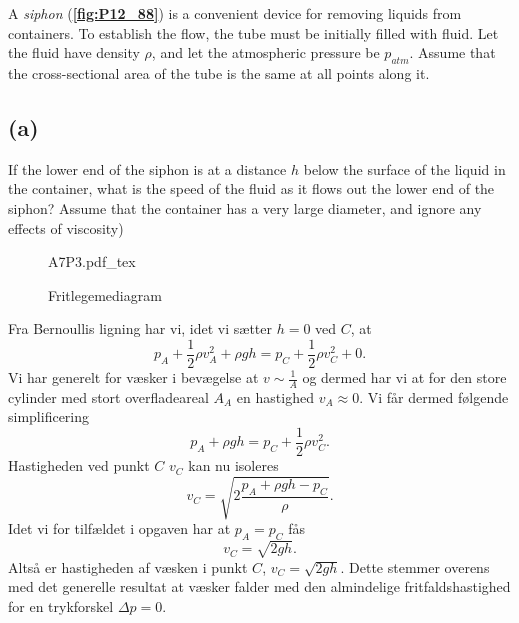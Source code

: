 \documentclass[12pt]{article}
\newcommand{\incfig}[2][1]{%
  \def\svgwidth{#1\columnwidth}
  {#2.pdf_tex}
}
\theoremstyle{definition}
\begin{document}
A \textit{siphon} (\textbf{\autoref{fig:P12_88}}) is a convenient device for removing liquids from containers. To establish the flow, the tube must be initially filled with fluid. Let the fluid have density $\rho$, and let the atmospheric pressure be $p_{atm}$. Assume that the cross-sectional area of the tube is the same at all points along it.

\subsection*{(a)}
If the lower end of the siphon is at a distance $h$ below the surface of the liquid in the container, what is the speed of the fluid as it flows out the lower end of the siphon? Assume that the container has a very large diameter, and ignore any effects of viscosity)
\bigbreak
\begin{figure}[ht]
  \centering
  \incfig[0.6]{A7P3}
  \caption{Fritlegemediagram}
  \label{fig:A7P3}
\end{figure}
\bigbreak
Fra Bernoullis ligning har vi, idet vi sætter $h = 0$ ved $C$, at
\[ 
p_A + \frac{1}{2}\rho v_A^2 + \rho gh = p_C + \frac{1}{2}\rho v_C^2 + 0
.\]
Vi har generelt for væsker i bevægelse at $v \sim \frac{1}{A}$ og dermed har vi at for den store cylinder med stort overfladeareal $A_A$ en hastighed $v_A \approx 0$. Vi får dermed følgende simplificering
\[ 
p_A + \rho gh = p_C + \frac{1}{2}\rho v_C^2
.\]
Hastigheden ved punkt $C$ $v_C$ kan nu isoleres
\[ 
  v_C = \sqrt{2\frac{p_A + \rho gh - p_C}{\rho}}
.\]
Idet vi for tilfældet i opgaven har at $p_A = p_C$ fås
\[ 
v_C = \sqrt{2gh}
.\]
Altså er hastigheden af væsken i punkt $C$, \underline{\underline{$v_C = \sqrt{2gh}$}}. Dette stemmer overens med det generelle resultat at væsker falder med den almindelige fritfaldshastighed for en trykforskel $\Delta p = 0$.
\end{document}
